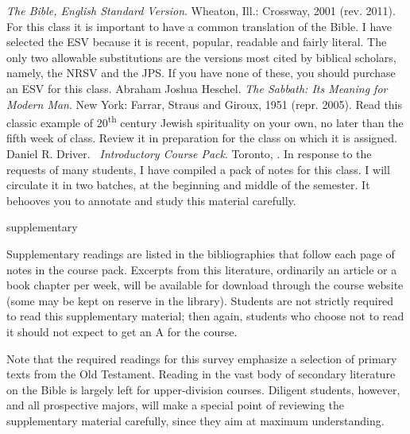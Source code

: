 \documentclass[titlepage]{article}
\begin{document}
\begingroup
\renewcommand{\section}[2]{}%
\begin{thebibliography}{Heschel}%
   \emph{The Bible, English Standard Version}.
    Wheaton, Ill.: Crossway, 2001 (rev. 2011). For this class it is
    important to have a common translation of the Bible. I have selected
    the ESV because it is recent, popular, readable and fairly literal.
    The only two allowable substitutions are the versions most cited by
    biblical scholars, namely, the NRSV and the JPS. If you have none of
    these, you should purchase an ESV for this class.
   Abraham Joshua Heschel.
    \emph{The Sabbath: Its Meaning for Modern Man}. New York: Farrar,
    Straus and Giroux, 1951 (repr. 2005). Read this classic example of
    20\textsuperscript{th} century Jewish spirituality on your own, no
    later than the fifth week of class. Review it in preparation for the
    class on which it is assigned.
   Daniel R. Driver.
    \emph{\ctitle\ Introductory Course Pack}. Toronto, \csemester.
    In response to the requests of many students, I have compiled a pack
    of notes for this class. I will circulate it in two batches, at the
    beginning and middle of the semester. It behooves you to annotate
    and study this material carefully.
\end{thebibliography}
\endgroup

\section{Supplementary Texts}
\label{supplementary}

Supplementary readings are listed in the bibliographies that follow each
page of notes in the course pack. Excerpts from this literature,
ordinarily an article or a book chapter per week, will be available for
download through the course website (some may be kept on reserve in the
library). Students are not strictly required to read this supplementary
material; then again, students who choose not to read it should not
expect to get an A for the course.

Note that the required readings for this survey emphasize a selection of
primary texts from the Old Testament. Reading in the vast body of
secondary literature on the Bible is largely left for upper-division
courses. Diligent students, however, and all prospective majors, will
make a special point of reviewing the supplementary material carefully,
since they aim at maximum understanding.
\end{document}
